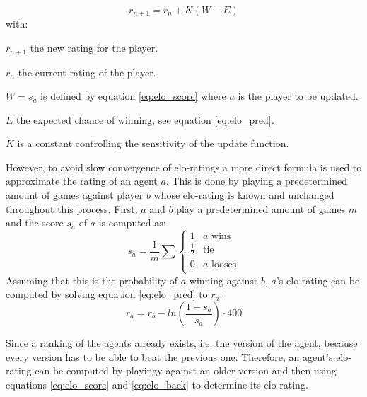 \documentclass[12pt]{article}
\begin{document}
\begin{equation} \label{eq:elo_update}
r_{n+1} = r_n + K(W - E)
\end{equation}
with:
\begin{description}
\item \(r_{n+1}\) the new rating for the player.
\item \(r_{n}\) the current rating of the player.
\item \(W = s_a\) is defined by equation \ref{eq:elo_score} where \(a\) is the player to be updated.
\item \(E\) the expected chance of winning, see equation \ref{eq:elo_pred}.
\item \(K\) is a constant controlling the sensitivity of the update function.
\end{description}
However, to avoid slow convergence of elo-ratings a more direct formula is used to approximate the rating of an agent \(a\). This is done by playing a predetermined amount of games against player \(b\) whose elo-rating is known and unchanged throughout this process. First, \(a\) and \(b\) play a predetermined amount of games \(m\) and the score \(s_a\) of \(a\) is computed as:
\begin{equation} \label{eq:elo_score}
s_a = \frac{1}{m}\sum\left\{
\begin{array}{ll}
1 &              a\textrm{ wins} \\
\frac{1}{2} & \textrm{tie}\\
0 &              a\textrm{ looses}\\
\end{array}
\right.
\end{equation}
Assuming that this is the probability of \(a\) winning against \(b\), \(a\)'s elo rating can be computed by solving equation \ref{eq:elo_pred} to \(r_a\):
\begin{equation} \label{eq:elo_back}
r_a = r_b - ln\left(\frac{1-s_a}{s_a}\right) \cdot 400
\end{equation}
\begin{center}

\end{center}
Since a ranking of the agents already exists, i.e. the version of the agent, because every version has to be able to beat the previous one. Therefore, an agent's elo-rating can be computed by playingy against an older version and then using equations \ref{eq:elo_score} and \ref{eq:elo_back} to determine its elo rating. 
\end{document}
